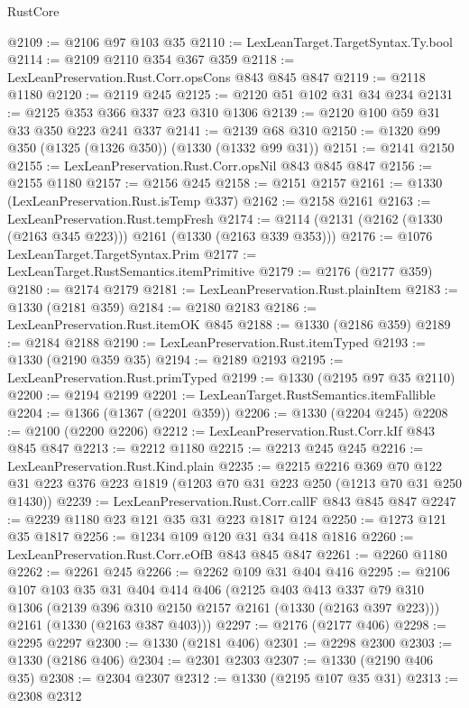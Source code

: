 \begin{lexlean}{RustCore}
\begin{coremodule}
@2109 := @2106 @97 @103 @35
@2110 := LexLeanTarget.TargetSyntax.Ty.bool
@2114 := @2109 @2110 @354 @367 @359
@2118 := LexLeanPreservation.Rust.Corr.opsCons @843 @845 @847
@2119 := @2118 @1180
@2120 := @2119 @245
@2125 := @2120 @51 @102 @31 @34 @234
@2131 := @2125 @353 @366 @337 @23 @310 @1306
@2139 := @2120 @100 @59 @31 @33 @350 @223 @241 @337
@2141 := @2139 @68 @310
@2150 := @1320 @99 @350 (@1325 (@1326 @350)) (@1330 (@1332 @99 @31))
@2151 := @2141 @2150
@2155 := LexLeanPreservation.Rust.Corr.opsNil @843 @845 @847
@2156 := @2155 @1180
@2157 := @2156 @245
@2158 := @2151 @2157
@2161 := @1330 (LexLeanPreservation.Rust.isTemp @337)
@2162 := @2158 @2161
@2163 := LexLeanPreservation.Rust.tempFresh
@2174 := @2114 (@2131 (@2162 (@1330 (@2163 @345 @223))) @2161 (@1330 (@2163 @339 @353)))
@2176 := @1076 LexLeanTarget.TargetSyntax.Prim
@2177 := LexLeanTarget.RustSemantics.itemPrimitive
@2179 := @2176 (@2177 @359)
@2180 := @2174 @2179
@2181 := LexLeanPreservation.Rust.plainItem
@2183 := @1330 (@2181 @359)
@2184 := @2180 @2183
@2186 := LexLeanPreservation.Rust.itemOK @845
@2188 := @1330 (@2186 @359)
@2189 := @2184 @2188
@2190 := LexLeanPreservation.Rust.itemTyped
@2193 := @1330 (@2190 @359 @35)
@2194 := @2189 @2193
@2195 := LexLeanPreservation.Rust.primTyped
@2199 := @1330 (@2195 @97 @35 @2110)
@2200 := @2194 @2199
@2201 := LexLeanTarget.RustSemantics.itemFallible
@2204 := @1366 (@1367 (@2201 @359))
@2206 := @1330 (@2204 @245)
@2208 := @2100 (@2200 @2206)
@2212 := LexLeanPreservation.Rust.Corr.kIf @843 @845 @847
@2213 := @2212 @1180
@2215 := @2213 @245 @245
@2216 := LexLeanPreservation.Rust.Kind.plain
@2235 := @2215
    @2216
    @369
    @70
    @122
    @31
    @223
    @376
    @223
    @1819
    (@1203 @70 @31 @223 @250 (@1213 @70 @31 @250 @1430))
@2239 := LexLeanPreservation.Rust.Corr.callF @843 @845 @847
@2247 := @2239 @1180 @23 @121 @35 @31 @223 @1817 @124
@2250 := @1273 @121 @35 @1817
@2256 := @1234 @109 @120 @31 @34 @418 @1816
@2260 := LexLeanPreservation.Rust.Corr.eOfB @843 @845 @847
@2261 := @2260 @1180
@2262 := @2261 @245
@2266 := @2262 @109 @31 @404 @416
@2295 := @2106
    @107
    @103
    @35
    @31
    @404
    @414
    @406
    (@2125
      @403
      @413
      @337
      @79
      @310
      @1306
      (@2139 @396 @310 @2150 @2157 @2161 (@1330 (@2163 @397 @223)))
      @2161
      (@1330 (@2163 @387 @403)))
@2297 := @2176 (@2177 @406)
@2298 := @2295 @2297
@2300 := @1330 (@2181 @406)
@2301 := @2298 @2300
@2303 := @1330 (@2186 @406)
@2304 := @2301 @2303
@2307 := @1330 (@2190 @406 @35)
@2308 := @2304 @2307
@2312 := @1330 (@2195 @107 @35 @31)
@2313 := @2308 @2312

\end{coremodule}
\end{lexlean}
